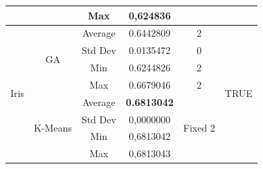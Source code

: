 \documentclass[journal]{IEEEtran}
\begin{document}
\begin{table}[]
\begin{tabular}{|c|c|c|c|c|c|}
			&                               & Max                            & 0,624836                    &                          &                       \\ \hline
			\multirow{8}{*}{Iris}                  & \multirow{4}{*}{GA}           & Average                        & 0.6442809                   & 2                        & \multirow{8}{*}{TRUE} \\ \cline{3-5}
			&                               & Std Dev                        & 0.0135472                   & 0                        &                       \\ \cline{3-5}
			&                               & Min                            & 0.6244826                   & 2                        &                       \\ \cline{3-5}
			&                               & Max                            & 0.6679046                   & 2                        &                       \\ \cline{2-5}
			& \multirow{4}{*}{K-Means}      & Average                        & \textbf{0.6813042}                   & \multirow{4}{*}{Fixed 2} &                       \\ \cline{3-4}
			&                               & Std Dev                        & 0,0000000                   &                          &                       \\ \cline{3-4}
			&                               & Min                            & 0,6813042                   &                          &                       \\ \cline{3-4}
			&                               & Max                            & 0,6813043                   &                          &                       \\ \cline{3-4}
		\end{tabular}
	\end{table}
	
\end{document}
